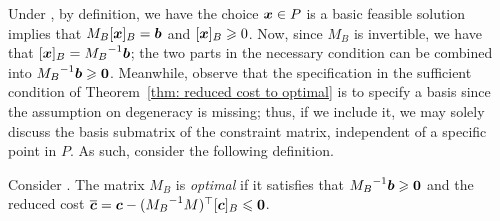 Under \LPSA, by definition, we have the choice ${\boldsymbol x}\in P$ is a basic feasible solution implies that $M_B[{\boldsymbol x}]_B = {\boldsymbol b}$ and $[{\boldsymbol x}]_B \geqslant 0$. Now, since $M_B$ is invertible, we have that $[{\boldsymbol x}]_B = {M_B}^{-1}{\boldsymbol b}$; the two parts in the necessary condition can be combined into $ {M_B}^{-1}{\boldsymbol b} \geqslant \boldsymbol0 $. Meanwhile, observe that the specification in the sufficient condition of Theorem~\ref{thm: reduced cost to optimal} is to specify a basis since the assumption on degeneracy is missing; thus, if we include it, we may solely discuss the basis submatrix of the constraint matrix, independent of a specific point in $P$. As such, consider the following definition. 

\begin{definition}
Consider \LPSA. The matrix $M_B$ is {\em optimal} if it satisfies that ${M_B}^{-1} {\boldsymbol b} \geqslant \boldsymbol0$ and the reduced cost $\overline{{\boldsymbol c}} = {\boldsymbol c} -  ({M_B}^{-1}M)^\top [{\boldsymbol c}]_B \leqslant \boldsymbol0$. 
\end{definition}




